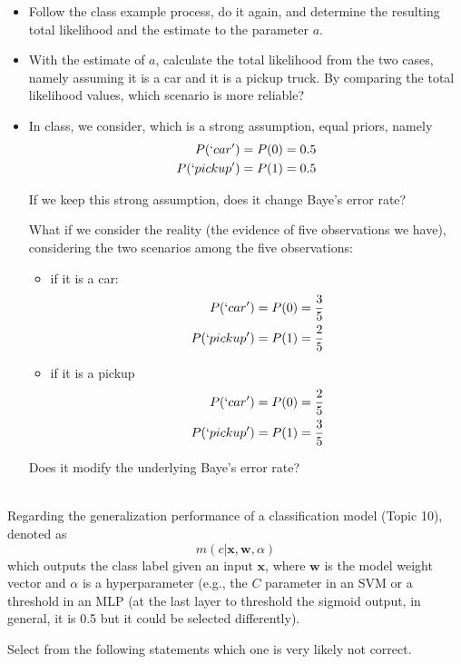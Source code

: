 \documentclass[12pt]{article}
\begin{document}
\begin{itemize}
    \item Follow the class example process, do it again, and determine the resulting total likelihood and the estimate to the parameter $a$.
    \item With the estimate of $a$, calculate the total likelihood from the two cases, namely assuming it is a car and it is a pickup truck. By comparing the total likelihood values, which scenario is more reliable?
    \item In class, we consider, which is a strong assumption, equal priors, namely 
    \begin{align*}
    P(`car') & = P(0) = 0.5 \\
    P(`pickup') &= P(1) = 0.5
    \end{align*}

If we keep this strong assumption, does it change Baye's error rate?

What if we consider the reality (the evidence of five observations we have), considering the two scenarios among the five observations:
\begin{itemize}
\item if it is a car:
  \begin{align*}
    P(`car') & = P(0) = \frac{3}{5} \\
    P(`pickup') &= P(1) = \frac{2}{5}
    \end{align*}
\item if it is a pickup
  \begin{align*}
    P(`car') & = P(0) = \frac{2}{5} \\
    P(`pickup') &= P(1) = \frac{3}{5}
    \end{align*}
\end{itemize}
Does it modify the underlying Baye's error rate?
    
\end{itemize}

\newpage
\noindent {} \\
Regarding the generalization performance of a classification model (Topic 10), denoted as 
\[
m(c|\bm{x}, \bm{w}, \alpha)
\]
which outputs the class label given an input $\bm{x}$, where $\bm{w}$ is the model weight vector and $\alpha$ is a hyperparameter (e.g., the $C$ parameter in an SVM or a threshold in an MLP (at the last layer to threshold the sigmoid output, in general, it is 0.5 but it could be selected differently). 

Select from the following statements which one is very likely not correct.
\end{document}
